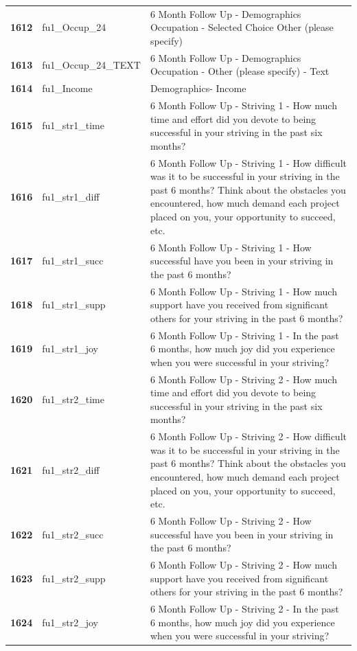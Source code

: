 \documentclass[
  letterpaper,
  DIV=11,
  numbers=noendperiod]{scrartcl}
\begin{document}
\begin{longtable}[t]{>{}cll}
\textbf{1612} & fu1\_Occup\_24 & 6 Month Follow Up - Demographics Occupation - Selected Choice Other (please specify)\\
\textbf{1613} & fu1\_Occup\_24\_TEXT & 6 Month Follow Up - Demographics Occupation - Other (please specify) - Text\\
\textbf{1614} & fu1\_Income & Demographics- Income\\
\textbf{1615} & fu1\_str1\_time & 6 Month Follow Up - Striving 1 - How much time and effort did you devote to being successful in your striving in the past six months?\\
\addlinespace
\textbf{1616} & fu1\_str1\_diff & 6 Month Follow Up - Striving 1 - How difficult was it to be successful in your striving in the past 6 months? Think about the obstacles you encountered, how much demand each project placed on you, your opportunity to succeed, etc.\\
\textbf{1617} & fu1\_str1\_succ & 6 Month Follow Up - Striving 1 - How successful have you been in your striving in the past 6 months?\\
\textbf{1618} & fu1\_str1\_supp & 6 Month Follow Up - Striving 1 - How much support have you received from significant others for your striving in the past 6 months?\\
\textbf{1619} & fu1\_str1\_joy & 6 Month Follow Up - Striving 1 - In the past 6 months, how much joy did you experience when you were successful in your striving?\\
\textbf{1620} & fu1\_str2\_time & 6 Month Follow Up - Striving 2 - How much time and effort did you devote to being successful in your striving in the past six months?\\
\addlinespace
\textbf{1621} & fu1\_str2\_diff & 6 Month Follow Up - Striving 2 - How difficult was it to be successful in your striving in the past 6 months? Think about the obstacles you encountered, how much demand each project placed on you, your opportunity to succeed, etc.\\
\textbf{1622} & fu1\_str2\_succ & 6 Month Follow Up - Striving 2 - How successful have you been in your striving in the past 6 months?\\
\textbf{1623} & fu1\_str2\_supp & 6 Month Follow Up - Striving 2 - How much support have you received from significant others for your striving in the past 6 months?\\
\textbf{1624} & fu1\_str2\_joy & 6 Month Follow Up - Striving 2 - In the past 6 months, how much joy did you experience when you were successful in your striving?\\

\end{longtable}
\end{document}
